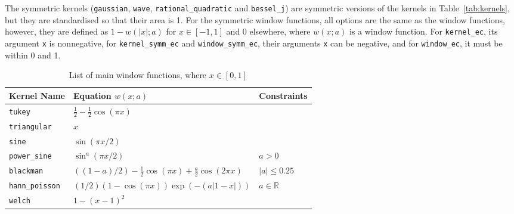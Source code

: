 The symmetric kernels (\texttt{gaussian}, \texttt{wave}, \texttt{rational\_quadratic} and \texttt{bessel\_j}) are symmetric versions of the kernels in Table~\ref{tab:kernels}, but they are standardised so that their area is 1.
For the symmetric window functions, all options are the same as the window functions, however, they are defined as \(1 - w(\left|x\right|;a)\) for \(x \in [-1, 1]\) and \(0\) elsewhere, where \(w(x;a)\) is a window function.
For \texttt{kernel\_ec}, its argument \texttt{x} is nonnegative, for \texttt{kernel\_symm\_ec} and \texttt{window\_symm\_ec}, their arguments \texttt{x} can be negative, and for \texttt{window\_ec}, it must be within 0 and 1.
\begin{table}[htb!]
    \centering
    \begin{tabular}{l l l} \toprule
        Kernel Name             &  Equation \(w(x; a)\)      & Constraints                 \\ \midrule %
        \texttt{tukey}        & \(\frac{1}{2} - \frac{1}{2} \cos(\pi x)\)   &   \\%
        \texttt{triangular}   & \(x\) &   \\%
        \texttt{sine}         & \(\sin(\pi x / 2)\) &   \\%
        \texttt{power\_sine}   & \(\sin^{a}(\pi x / 2)\) & \(   a > 0\) \\%
        \texttt{blackman}     & \(( (1 - a) / 2) - \frac{1}{2} \cos(\pi x) + \frac{a}{2} \cos(2 \pi x)\)   & \(   \left|a\right| \leq 0.25 \) \\%
        \texttt{hann\_poisson} & \((1/2) (1 - \cos(\pi x)) \exp( - (a \left|1 - x \right|) )\)   & \( a \in \mathbb{R}\) \\%
        \texttt{welch}        & \(1 - (x - 1)^2 \)   &   \\ \bottomrule%
    \end{tabular}
    \caption{List of main window functions, where \(x \in [0, 1]\)}
    \label{tab:windows}
\end{table}

